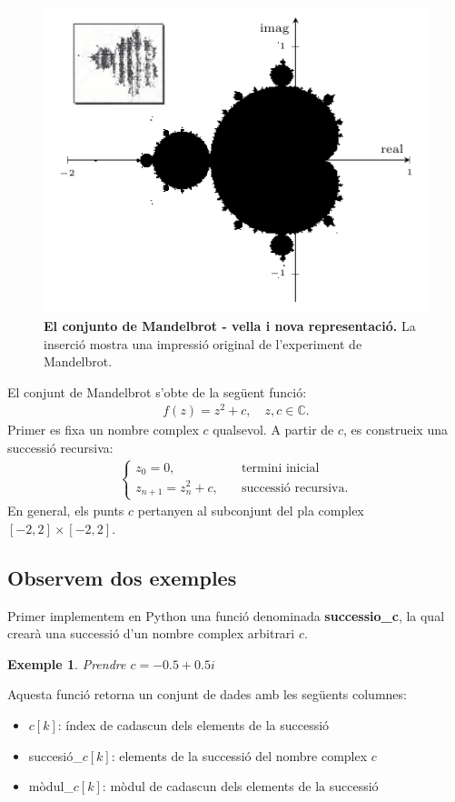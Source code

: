 \documentclass[12pt,a4paper]{report}
\newtheorem{eje}{Exemple}[chapter]
\begin{document}
\begin{figure}[!ht]
\centering
\includegraphics[scale=1]{img/06_mandelbrot_original.pdf}
\caption{\textbf{El conjunto de Mandelbrot - vella i nova representació.} La inserció mostra una impressió original de l'experiment de Mandelbrot.}
\label{fig06_mandelbrot_original}
\end{figure}

El conjunt de Mandelbrot s'obte de la següent funció:
\begin{align}\label{eq02_mandelbrot}
f(z)=z^2 + c,\quad z, c \in \mathbb{C}.
\end{align}
Primer es fixa un nombre complex \(c\) qualsevol. A partir de \(c\), es construeix una successió recursiva:
\begin{align*}
\left\{ \begin{array}{ll}
z_0 = 0,\quad & \text{termini inicial} \\
z_{n+1} = z_{n}^{2} + c,\quad & \text{successió recursiva.}
\end{array}\right.
\end{align*}
En general, els punts \(c\) pertanyen al subconjunt del pla complex  \([-2,2]\times[-2,2]\).

\subsection{Observem dos exemples}
Primer implementem en Python una funció denominada \textbf{successio\_c}, la qual crearà una successió d'un nombre complex arbitrari $c$.
{
}
\begin{eje}\label{eje2_1}
Prendre $c=-0.5 + 0.5i$
\end{eje}
{
}
Aquesta funció retorna un conjunt de dades amb les següents columnes:
\begin{itemize}
\item $c[k]$: índex de cadascun dels elements de la successió
\item succesió\_$c[k]$: elements de la successió del nombre complex $c$
\item mòdul\_$c[k]$: mòdul de cadascun dels elements de la successió
\end{itemize} 
\end{document}
